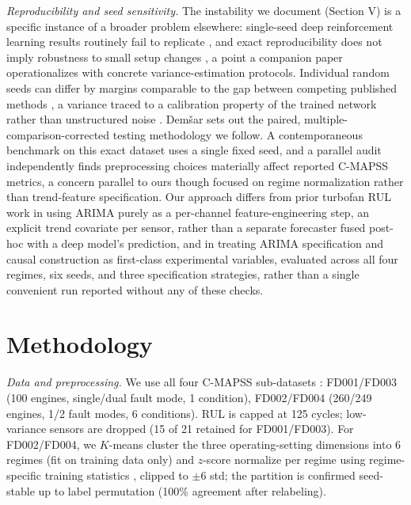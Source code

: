 \documentclass[conference]{IEEEtran}
\begin{document}
\emph{Reproducibility and seed sensitivity.} The instability we document (Section V) is a specific instance of a broader problem elsewhere: single-seed deep reinforcement learning results routinely fail to replicate \cite{henderson2018}, and exact reproducibility does not imply robustness to small setup changes \cite{bouthillier2019}, a point a companion paper \cite{bouthillier2021} operationalizes with concrete variance-estimation protocols. Individual random seeds can differ by margins comparable to the gap between competing published methods \cite{picard2021}, a variance traced to a calibration property of the trained network rather than unstructured noise \cite{jordan2024}. Demšar \cite{demsar2006} sets out the paired, multiple-comparison-corrected testing methodology we follow. A contemporaneous benchmark on this exact dataset \cite{goel2026} uses a single fixed seed, and a parallel audit \cite{gupta2026} independently finds preprocessing choices materially affect reported C-MAPSS metrics, a concern parallel to ours though focused on regime normalization rather than trend-feature specification. Our approach differs from prior turbofan RUL work in using ARIMA purely as a per-channel feature-engineering step, an explicit trend covariate per sensor, rather than a separate forecaster fused post-hoc with a deep model's prediction, and in treating ARIMA specification and causal construction as first-class experimental variables, evaluated across all four regimes, six seeds, and three specification strategies, rather than a single convenient run reported without any of these checks.

\section{Methodology}
\emph{Data and preprocessing.} We use all four C-MAPSS sub-datasets \cite{saxena2008}: FD001/FD003 (100 engines, single/dual fault mode, 1 condition), FD002/FD004 (260/249 engines, 1/2 fault modes, 6 conditions). RUL is capped at 125 cycles; low-variance sensors are dropped (15 of 21 retained for FD001/FD003). For FD002/FD004, we $K$-means cluster the three operating-setting dimensions into 6 regimes (fit on training data only) and $z$-score normalize per regime using regime-specific training statistics \cite{regimenorm2018}, clipped to $\pm 6$ std; the partition is confirmed seed-stable up to label permutation (100\% agreement after relabeling).
\end{document}
